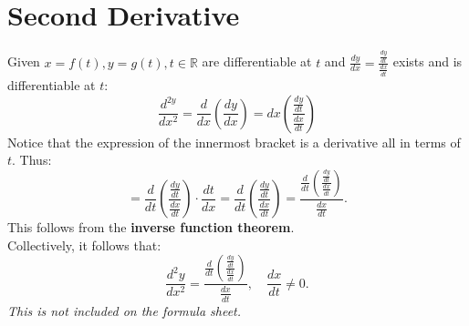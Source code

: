 \documentclass{article}
\begin{document}
\section*{Second Derivative}
\begin{theorembox}
Given \( x = f(t), y = g(t), t \in \mathbb{R} \) are differentiable at \( t \) and \( \frac{dy}{dx} = \frac{\frac{dy}{dt}}{\frac{dx}{dt}} \) exists and is differentiable at \( t \):
\[
    \frac{d^{2y}}{dx^2} = \frac{d}{dx}(\frac{dy}{dx}) = dx(\frac{\frac{dy}{dt}}{\frac{dx}{dt}})
\]
Notice that the expression of the innermost bracket is a derivative all in terms of \( t \).
Thus:
\[
    = \frac{d}{dt}(\frac{\frac{dy}{dt}}{\frac{dx}{dt}}) \cdot \frac{dt}{dx} = \frac{d}{dt}(\frac{\frac{dy}{dt}}{\frac{dx}{dt}}) = \frac{\frac{d}{dt}(\frac{\frac{dy}{dt}}{\frac{dx}{dt}})}{\frac{dx}{dt}} \text{.}
\]
This follows from the \textbf{inverse function theorem}. \\
Collectively, it follows that:
\[
    \frac{d^2y}{dx^2} = \frac{\frac{d}{dt}(\frac{\frac{dy}{dt}}{\frac{dx}{dt}})}{\frac{dx}{dt}}, \quad \frac{dx}{dt} \neq 0 \text{.}
\]
\textit{This is not included on the formula sheet.}
\end{theorembox}
\end{document}
